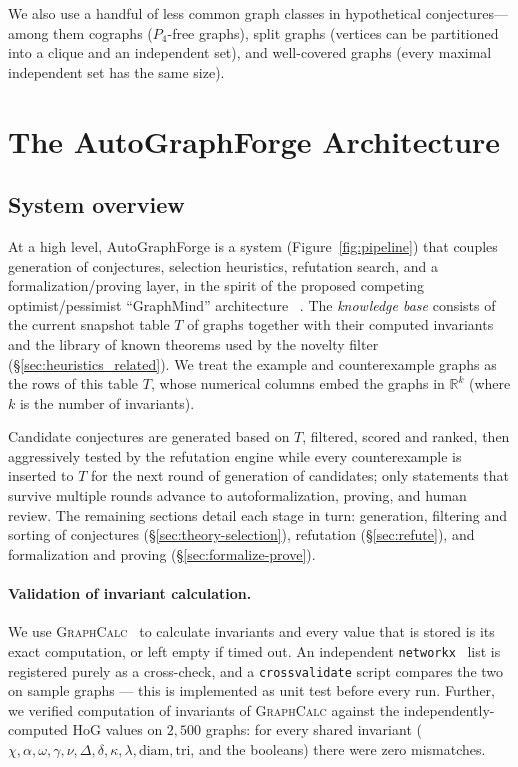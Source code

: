 \documentclass[]{ceurart}
\begin{document}
We also use a handful of less common graph
classes in hypothetical conjectures---among them cographs ($P_4$-free graphs), split graphs (vertices can be partitioned into a clique and an independent set), and well-covered graphs
(every maximal independent set has the same size).

\section{The AutoGraphForge Architecture}

\subsection{System overview}
\label{sec:pipeline-fig}
At a high level, \textsf{AutoGraphForge} is a system
(Figure~\ref{fig:pipeline}) that couples generation of conjectures, selection heuristics,
refutation search, and a formalization/proving layer, in the spirit of the proposed
competing optimist/pessimist ``GraphMind'' architecture ~\cite{davila2024optimist}. The \emph{knowledge base} consists of the current snapshot table $T$ of graphs together with their computed invariants and the library of known theorems used by the novelty filter (\S\ref{sec:heuristics_related}). We treat the example and counterexample graphs as the rows of this table $T$,
whose numerical columns embed the graphs in $\mathbb{R}^k$ (where $k$ is the number of invariants).

Candidate conjectures are generated based on $T$, filtered, scored and ranked, then aggressively tested by the refutation engine while  every counterexample is inserted to $T$ for the next round of generation of candidates; only statements that survive multiple rounds advance to
autoformalization, proving, and human review. The remaining sections detail each stage in turn: generation, filtering and sorting of conjectures (\S\ref{sec:theory-selection}),
refutation (\S\ref{sec:refute}), and formalization and proving
(\S\ref{sec:formalize-prove}).

\paragraph{Validation of invariant calculation.} We use
\textsc{GraphCalc}~\cite{davila2025graphcalc} to calculate invariants and
every value that is stored is its exact computation, or left empty if timed out. An
independent \texttt{networkx}~\cite{hagberg2008networkx} list is registered purely as a cross-check, and
a \texttt{crossvalidate} script compares the two on sample graphs --- this is implemented as unit test before every run. Further, we verified computation of invariants of \textsc{GraphCalc} against the independently-computed HoG values on $2{,}500$
graphs: for every shared invariant
($\chi,\alpha,\omega,\gamma,\nu,\Delta,\delta,\kappa,\lambda,\mathrm{diam},
\mathrm{tri}$, and the booleans) there were zero mismatches.
\end{document}
